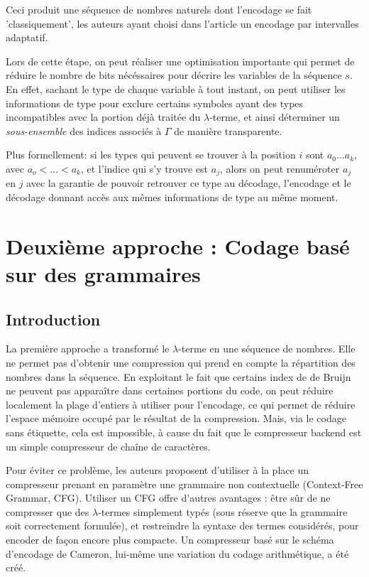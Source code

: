 \documentclass[titlepage]{article}
\begin{document}
Ceci produit une séquence de nombres naturels dont l'encodage se fait
'classiquement', les auteurs ayant choisi dans l'article un encodage par intervalles
adaptatif.

Lors de cette étape, on peut réaliser une optimisation importante qui permet de
réduire le nombre de bits nécéssaires pour décrire les variables de la séquence $s$.
En effet, sachant le type de chaque variable à tout instant, on peut utiliser les informations
de type pour exclure certains symboles ayant des types incompatibles avec la portion déjà
traitée du $\lambda$-terme, et ainsi déterminer un \emph{sous-ensemble} des indices associés à $\Gamma$
de manière transparente.

Plus formellement: si les types qui peuvent se trouver à la position $i$ sont ${a_0 ... a_k}$,
avec $a_o < ... < a_k$, et l'indice qui s'y trouve est $a_j$, alors on peut renuméroter
$a_j$ en $j$ avec la garantie de pouvoir retrouver ce type au décodage, l'encodage et
le décodage donnant accès aux mêmes informations de type au même moment.

\section{Deuxième approche : Codage basé sur des grammaires}
\subsection{Introduction}
La première approche a transformé le $\lambda$-terme en une séquence de nombres. Elle ne permet pas d'obtenir une compression qui prend en compte la répartition des nombres dans la séquence. En exploitant le fait que certains index de de Bruijn ne peuvent pas apparaître dans certaines portions du code, on peut réduire localement la plage d'entiers à utiliser pour l'encodage, ce qui permet de réduire l'espace mémoire occupé par le résultat de la compression. Mais, via le codage sans étiquette, cela est impossible, à cause du fait que le compresseur backend est un simple compresseur de chaîne de caractères.

Pour éviter ce problème, les auteurs proposent d'utiliser à la place un compresseur prenant en paramètre une grammaire non contextuelle (Context-Free Grammar, CFG). Utiliser un CFG offre d'autres avantages : être sûr de ne compresser que des $\lambda$-termes simplement typés (sous réserve que la grammaire soit correctement formulée), et restreindre la syntaxe des termes considérés, pour encoder de façon encore plus compacte. Un compresseur basé sur le schéma d'encodage de Cameron, lui-même une variation du codage arithmétique, a été créé.
\end{document}
